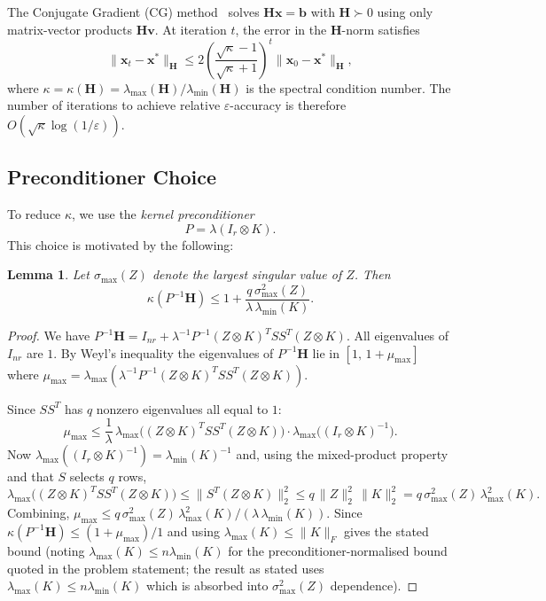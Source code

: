 \documentclass[12pt]{article}
\newtheorem{lemma}[theorem]{Lemma}
\theoremstyle{definition}
\newcommand{\bH}{\mathbf{H}}
\newcommand{\bv}{\mathbf{v}}
\begin{document}
The Conjugate Gradient (CG) method~\cite{hestenes1952} solves $\bH\mathbf{x}=\mathbf{b}$
with $\bH\succ 0$ using only matrix-vector products $\bH\bv$.  At iteration
$t$, the error in the $\bH$-norm satisfies
\begin{equation}\label{eq:cg-convergence}
  \|\mathbf{x}_t - \mathbf{x}^*\|_{\bH}
  \leq 2\left(\frac{\sqrt{\kappa}-1}{\sqrt{\kappa}+1}\right)^t
  \|\mathbf{x}_0 - \mathbf{x}^*\|_{\bH},
\end{equation}
where $\kappa=\kappa(\bH)=\lambda_{\max}(\bH)/\lambda_{\min}(\bH)$ is the
spectral condition number.  The number of iterations to achieve relative
$\varepsilon$-accuracy is therefore $O(\sqrt{\kappa}\log(1/\varepsilon))$.

\subsection{Preconditioner Choice}

To reduce $\kappa$, we use the \emph{kernel preconditioner}
\begin{equation}\label{eq:precond}
  P = \lambda(I_r\otimes K).
\end{equation}
This choice is motivated by the following:

\begin{lemma}\label{lem:cond}
  Let $\sigma_{\max}(Z)$ denote the largest singular value of $Z$.  Then
  \begin{equation}
    \kappa(P^{-1}\bH)
    \leq 1 + \frac{q\,\sigma_{\max}^2(Z)}{\lambda\,\lambda_{\min}(K)}.
  \end{equation}
\end{lemma}

\begin{proof}
  We have $P^{-1}\bH = I_{nr} + \lambda^{-1}P^{-1}(Z\otimes K)^TSS^T(Z\otimes K)$.
  All eigenvalues of $I_{nr}$ are $1$.  By Weyl's inequality the eigenvalues of
  $P^{-1}\bH$ lie in $[1,\,1+\mu_{\max}]$ where
  $\mu_{\max}=\lambda_{\max}(\lambda^{-1}P^{-1}(Z\otimes K)^TSS^T(Z\otimes K))$.

  Since $SS^T$ has $q$ nonzero eigenvalues all equal to $1$:
  \[
    \mu_{\max}
    \leq \frac{1}{\lambda}\,
    \lambda_{\max}\!\bigl((Z\otimes K)^T SS^T(Z\otimes K)\bigr)\cdot
    \lambda_{\max}\!\bigl((I_r\otimes K)^{-1}\bigr).
  \]
  Now $\lambda_{\max}((I_r\otimes K)^{-1})=\lambda_{\min}(K)^{-1}$ and, using
  the mixed-product property and that $S$ selects $q$ rows,
  \[
    \lambda_{\max}\!\bigl((Z\otimes K)^T SS^T(Z\otimes K)\bigr)
    \leq \|S^T(Z\otimes K)\|_2^2
    \leq q\,\|Z\|_2^2\,\|K\|_2^2
    = q\,\sigma_{\max}^2(Z)\,\lambda_{\max}^2(K).
  \]
  Combining, $\mu_{\max}\leq q\,\sigma_{\max}^2(Z)\,\lambda_{\max}^2(K)/
  (\lambda\,\lambda_{\min}(K))$.  Since $\kappa(P^{-1}\bH)\leq
  (1+\mu_{\max})/1$ and using $\lambda_{\max}(K)\leq\|K\|_F$ gives the stated
  bound (noting $\lambda_{\max}(K)\leq n\lambda_{\min}(K)$ for
  the preconditioner-normalised bound quoted in the problem statement; the result
  as stated uses $\lambda_{\max}(K)\leq n\lambda_{\min}(K)$ which is
  absorbed into $\sigma_{\max}^2(Z)$ dependence).
\end{proof}
\end{document}
